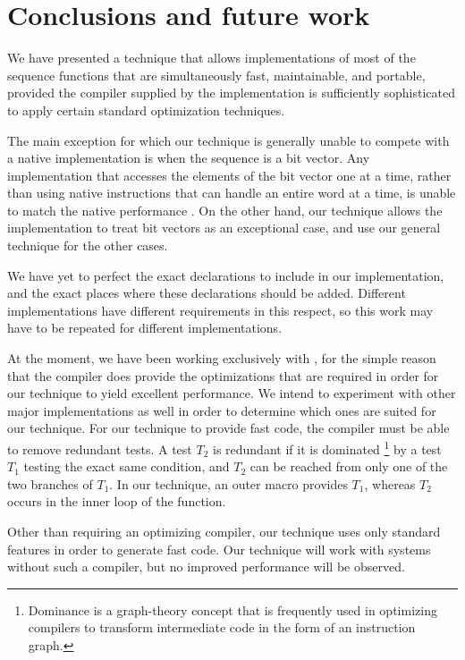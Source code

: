 \section{Conclusions and future work}
\label{sec-conclusions}

We have presented a technique that allows implementations of most of
the \commonlisp{} sequence functions that are simultaneously fast,
maintainable, and portable, provided the compiler supplied by the
implementation is sufficiently sophisticated to apply certain standard
optimization techniques.

The main exception for which our technique is generally unable to
compete with a native implementation is when the sequence is a bit
vector.  Any implementation that accesses the elements of the bit
vector one at a time, rather than using native instructions that can
handle an entire word at a time, is unable to match the native
performance \cite{Baker:1990:EIB:121989.121991}.  On the other hand,
our technique allows the \commonlisp{} implementation to treat bit
vectors as an exceptional case, and use our general technique for the
other cases.

We have yet to perfect the exact declarations to include in our
implementation, and the exact places where these declarations should
be added.  Different \commonlisp{} implementations have different
requirements in this respect, so this work may have to be repeated for
different implementations.

At the moment, we have been working exclusively with \sbcl{}, for the
simple reason that the \sbcl{} compiler does provide the optimizations
that are required in order for our technique to yield excellent
performance.  We intend to experiment with other major implementations
as well in order to determine which ones are suited for our
technique.  For our technique to provide fast code, the compiler must
be able to remove redundant tests.  A test $T_2$ is redundant if it is
dominated%
\footnote{Dominance is a graph-theory concept that is frequently used
  in optimizing compilers to transform intermediate code in the form
  of an instruction graph.}
by a test $T_1$ testing the exact same condition, and $T_2$ can be
reached from only one of the two branches of $T_1$.  In our technique,
an outer macro provides $T_1$, whereas $T_2$ occurs in the inner loop
of the function.

Other than requiring an optimizing compiler, our technique uses only
standard \commonlisp{} features in order to generate fast code.  Our
technique will work with systems without such a compiler, but no
improved performance will be observed.

